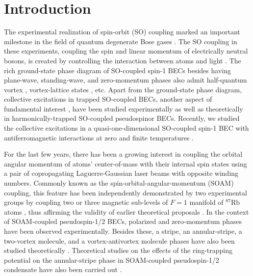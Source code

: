 \documentclass[pra,twocolumn,aps,superscriptaddress,showpacs,longbibliography]{revtex4-1}
\begin{document}
\section{Introduction}
The experimental realization of spin-orbit (SO) coupling marked an important milestone 
in the field of quantum degenerate Bose gases \cite{lin2011spin,campbell2016magnetic,luo2016tunable}.
The SO coupling in these experiments, coupling the spin and linear momentum of electrically neutral bosons, 
is created by controlling the interaction between atoms and light \cite{lin2011spin,campbell2016magnetic,luo2016tunable,goldman2014light}.
The rich ground-state phase diagram of SO-coupled spin-1 BECs besides having plane-wave, standing-wave, and 
zero-momentum phases \cite{wang2010spin,martone2016tricriticalities} also admit half-quantum vortex \cite{ramachandhran2012half}, 
vortex-lattice states \cite{ruokokoski2012stationary}, etc. Apart from the ground-state phase diagram, 
collective excitations in trapped SO-coupled BECs, another aspect of fundamental interest \cite{pethick_smith_2008,pitaevskii2016bose}, have been
studied experimentally \cite{PhysRevA.90.063624, PhysRevLett.114.105301} as well as theoretically \cite{PhysRevA.95.033616, PhysRevLett.127.115301} 
in harmonically-trapped SO-coupled pseudospinor BECs. Recently, we studied the collective excitations in 
a quasi-one-dimensional SO-coupled spin-1 BEC with antiferromagnetic interactions at zero and finite 
temperatures \cite{PhysRevA.106.013304}. 

For the last few years, there has been a growing interest in coupling the orbital angular momentum of atoms' center-of-mass 
with their internal spin states using a pair of copropagating Laguerre-Gaussian laser beams with opposite winding numbers.
Commonly known as the spin-orbital-angular-momentum (SOAM) coupling, this feature has been independently demonstrated 
by two experimental groups by coupling two \cite{zhang2019ground} or three magnetic sub-levels of $F = 1$ manifold of $^{87}$Rb atoms
\cite{chen2018spin,chen2018rotating}, thus affirming the validity of earlier theoretical proposals \cite{PhysRevA.92.033615,demarco2015angular,sun2015spin,qu2015quantum,chen2016spin,peng2022spin}. 
In the context of SOAM-coupled pseudospin-1/2 BECs, polarized and zero-momentum phases have been observed
experimentally. Besides these, a stripe, an annular-stripe, a two-vortex molecule, and a vortex-antivortex molecule phases have also
been studied theoretically \cite{qu2015quantum,duan2020symmetry,chen2020angular,chiu2020visible}.  
Theoretical studies on the effects of the ring-trapping potential on the annular-stripe phase in SOAM-coupled pseudospin-1/2 condensate 
have also been carried out \cite{sun2015spin,bidasyuk2022fine}.
  
\end{document}
